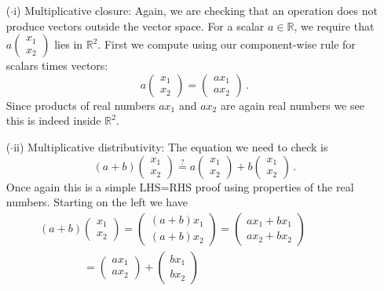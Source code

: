 {\begin{enumerate}
\item[($\cdot$i)] Multiplicative closure: Again, we are checking that 
an operation does not produce vectors outside the vector space. For a scalar $a\in{\mathbb R}$, we require that $a
\begin{pmatrix}x_1\\x_2\end{pmatrix}$ lies in ${\mathbb R}^2$.
First we compute using our component-wise rule for scalars times vectors:
\[
a
\begin{pmatrix}x_1\\x_2\end{pmatrix}=
\begin{pmatrix}ax_1\\ax_2\end{pmatrix}\, .
\]
Since products of real numbers $a x_1$ and $a x_2$ are again real numbers we see this is indeed inside ${\mathbb R}^2$.
\item[($\cdot$ii)] Multiplicative distributivity: The equation we need to check is
\[
(a+b)
\begin{pmatrix}x_1\\x_2\end{pmatrix}\stackrel?=
a\begin{pmatrix}x_1\\x_2\end{pmatrix}+
b\begin{pmatrix}x_1\\x_2\end{pmatrix}
\, .
\] 
Once again this is a simple LHS=RHS proof using properties of the real numbers. Starting on the left we have
\begin{gather*}
(a+b)
\begin{pmatrix}x_1\\x_2\end{pmatrix}
=
\begin{pmatrix}(a+b)x_1\\(a+b)x_2\end{pmatrix}
=
\begin{pmatrix}ax_1+b x_1\\ax_2+bx_2\end{pmatrix}
\qquad\qquad\\\qquad\qquad=
\begin{pmatrix}ax_1\\ax_2\end{pmatrix}+
\begin{pmatrix}b x_1\\bx_2\end{pmatrix}

\end{gather*}
\end{enumerate}}
